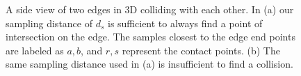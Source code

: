 \documentclass[9pt,twocolumn]{article}
\begin{document}
\begin{figure}[ht!]
\centering
{}
\caption{A side view of two edges in 3D colliding with each other. In (a) our sampling distance of $d_s$ is sufficient to always find a point of intersection on the edge. The samples closest to the edge end points are labeled as $a, b$, and $r, s$ represent the contact points. (b) The same sampling distance used in (a) is insufficient to find a collision. }
\label{EdgeEdge}
\end{figure}
\end{document}
